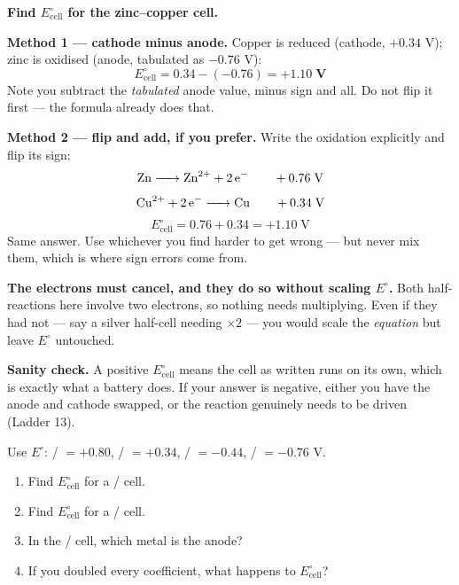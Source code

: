\documentclass{apchem-worksheet}
\begin{document}
\begin{workedexample}
\textbf{Find $E^{\circ}_{\text{cell}}$ for the zinc--copper cell.}

\textbf{Method 1 --- cathode minus anode.} Copper is reduced (cathode,
$+0.34$ V); zinc is oxidised (anode, tabulated as $-0.76$ V):
\[ E^{\circ}_{\text{cell}} = 0.34 - (-0.76)
   = \mathbf{+1.10\;\text{V}} \]
Note you subtract the \emph{tabulated} anode value, minus sign and all.
Do not flip it first --- the formula already does that.

\textbf{Method 2 --- flip and add, if you prefer.} Write the oxidation
explicitly and flip its sign:
\[ \ce{Zn -> Zn^2+ + 2e-} \qquad +0.76\;\text{V} \]
\[ \ce{Cu^2+ + 2e- -> Cu} \qquad +0.34\;\text{V} \]
\[ E^{\circ}_{\text{cell}} = 0.76 + 0.34 = +1.10\;\text{V} \]
Same answer. Use whichever you find harder to get wrong --- but never
mix them, which is where sign errors come from.

\textbf{The electrons must cancel, and they do so without scaling
$E^{\circ}$.} Both half-reactions here involve two electrons, so nothing
needs multiplying. Even if they had not --- say a silver half-cell
needing $\times 2$ --- you would scale the \emph{equation} but leave
$E^{\circ}$ untouched.

\textbf{Sanity check.} A positive $E^{\circ}_{\text{cell}}$ means the
cell as written runs on its own, which is exactly what a battery does.
If your answer is negative, either you have the anode and cathode
swapped, or the reaction genuinely needs to be driven (Ladder 13).
\end{workedexample}

\begin{yourturn}
Use $E^{\circ}$: / $= +0.80$, / $=
+0.34$, / $= -0.44$, / $= -0.76$ V.
\begin{enumerate}[leftmargin=*,itemsep=0.5em]
  \item Find $E^{\circ}_{\text{cell}}$ for a / cell.
        \workspace[1.8cm]
  \item Find $E^{\circ}_{\text{cell}}$ for a / cell.
        \workspace[1.8cm]
  \item In the / cell, which metal is the anode?
        \workspace[1.4cm]
  \item If you doubled every coefficient, what happens to
        $E^{\circ}_{\text{cell}}$? \workspace[1.6cm]
\end{enumerate}
\end{yourturn}
\end{document}
